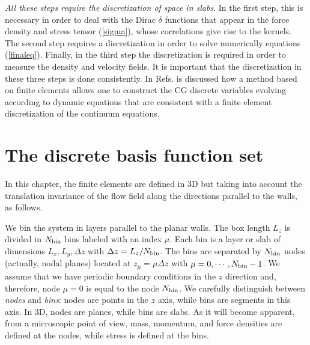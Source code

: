 \documentclass[b5paper,openright,10pt]{book}
\begin{document}
\textit{All  these  steps  require  the  discretization  of  space  in
  slabs}. In the  first step, this is necessary in  order to deal with
the Dirac $\delta$ functions that appear  in the force density and stress
  tensor (\ref{sigma}), whose correlations give  rise to the kernels. The
second step  requires a discretization  in order to  solve numerically
equations  (\ref{finaleq}).  Finally, in  the third step the discretization
is required in  order to measure the density and  velocity fields.  It
is  important that  the discretization  in these  three steps  is done
consistently. In Refs. \cite{DelaTorre2015,EspanolDonev2015} is discussed how  a method based
on  finite elements  allows one  to construct  the  CG discrete  variables
evolving according  to dynamic  equations that  are consistent  with a
finite  element  discretization of  the  continuum  equations. 


\section{The discrete basis function set}
\label{Sec:DiscreteBasis}
In this chapter, the finite elements are defined in 3D but taking into account the
translation invariance of the flow field along the directions parallel to the walls, as follows.

We bin  the system  in layers  parallel to the  planar walls.   The box
length $L_z$ is  divided in $N_{\rm bin}$ bins labeled  with an index
$\mu$.  Each bin  is a layer or slab of  dimensions $L_x,L_y,\Delta z$
with $\Delta  z=L_z/N_{\rm bin}$.  The  bins are separated  by $N_{\rm
  bin}$ nodes  (actually, nodal  planes) located at  $z_\mu=\mu \Delta
z$  with $\mu=0,\cdots,N_{\rm bin}-1$.   We assume  that we  have periodic
boundary  conditions  in  the  $z$ direction  and,  therefore,  node
$\mu=0$ is equal to the  node $N_{\rm bin}$.  We carefully distinguish
between \textit{nodes} and \textit{bins}: nodes  are points in the $z$
axis, while bins are segments in  this axis.  In 3D, nodes are planes,
while bins are slabs.  As it  will become apparent, from a microscopic
point of view, mass, momentum, and  force densities are defined at the
nodes, while stress is defined at the bins.
\end{document}
